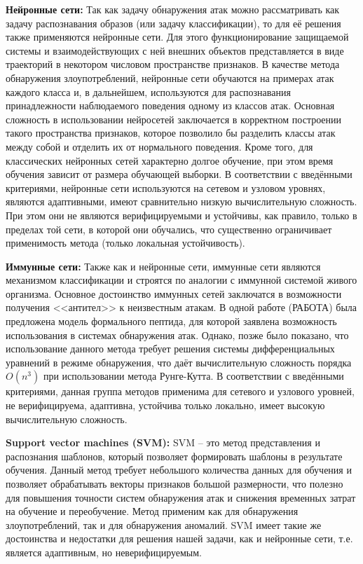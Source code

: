 \textbf{Нейронные сети:} Так как задачу обнаружения атак можно рассматривать как задачу распознавания образов (или задачу классификации), то для её решения также применяются нейронные сети. Для этого функционирование защищаемой системы и взаимодействующих с ней внешних объектов представляется в виде траекторий в некотором числовом пространстве признаков. В качестве метода обнаружения злоупотреблений, нейронные сети обучаются на примерах атак каждого класса и, в дальнейшем, используются для распознавания принадлежности наблюдаемого поведения одному из классов атак. Основная сложность в использовании нейросетей заключается в корректном построении такого пространства признаков, которое позволило бы разделить классы атак между собой и отделить их от нормального поведения. Кроме того, для классических нейронных сетей характерно долгое обучение, при этом время обучения зависит от размера обучающей выборки. В соответствии с введёнными критериями, нейронные сети используются на сетевом и узловом уровнях, являются адаптивными, имеют сравнительно низкую вычислительную сложность. При этом они не являются верифицируемыми и устойчивы, как правило, только в пределах той сети, в которой они обучались, что существенно ограничивает применимость метода (только локальная устойчивость).

\textbf{Иммунные сети:} Также как и нейронные сети, иммунные сети являются механизмом классификации и строятся по аналогии с иммунной системой живого организма. Основное достоинство иммунных сетей заключатся в возможности получения <<антител>> к неизвестным атакам. В одной работе (РАБОТА) была предложена модель формального пептида, для которой заявлена возможность использования в системах обнаружения атак. Однако, позже было показано, что использование данного метода требует решения системы дифференциальных уравнений в режиме обнаружения, что даёт вычислительную сложность порядка $O(n^3)$ при использовании метода Рунге-Кутта. В соответствии с введёнными критериями, данная группа методов применима для сетевого и узлового уровней, не верифицируема, адаптивна, устойчива только локально, имеет высокую вычислительную сложность.

\textbf{Support vector machines (SVM):} SVM – это метод представления и распознания шаблонов, который позволяет формировать шаблоны в результате обучения. Данный метод требует небольшого количества данных для обучения и позволяет обрабатывать векторы признаков большой размерности, что полезно для повышения точности систем обнаружения атак и снижения временных затрат на обучение и переобучение. Метод применим как для обнаружения злоупотреблений, так и для обнаружения аномалий. SVM имеет такие же достоинства и недостатки для решения нашей задачи, как и нейронные сети, т.е. является адаптивным, но неверифицируемым.


